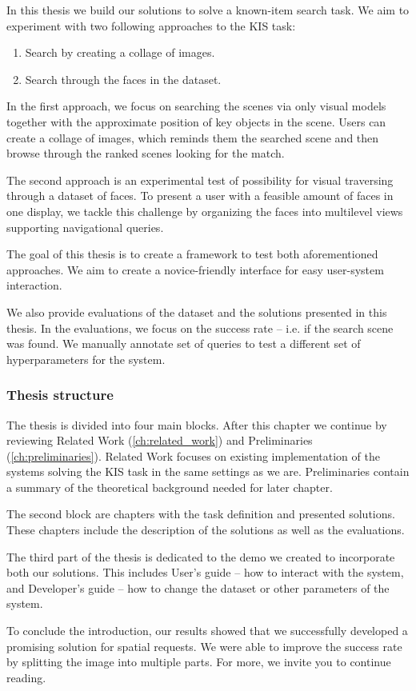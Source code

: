 In this thesis we build our solutions to solve a known-item search task. We aim to experiment with two following approaches to the KIS task:

\begin{enumerate}
  \item Search by creating a collage of images.
  \item Search through the faces in the dataset.
\end{enumerate}

In the first approach, we focus on searching the scenes via only visual models together with the approximate position of key objects in the scene. Users can create a collage of images, which reminds them the searched scene and then browse through the ranked scenes looking for the match.

The second approach is an experimental test of possibility for visual traversing through a  dataset of faces. To present a user with a feasible amount of faces in one display, we tackle this challenge by organizing the faces into multilevel views supporting navigational queries.

The goal of this thesis is to create a framework to test both aforementioned approaches. We aim to create a novice-friendly interface for easy user-system interaction.

We also provide evaluations of the dataset and the solutions presented in this thesis. In the evaluations, we focus on the success rate -- i.e. if the search scene was found. We manually annotate set of queries to test a different set of hyperparameters for the system.

\subsubsection*{Thesis structure}

The thesis is divided into four main blocks. After this chapter we continue by reviewing Related Work (\autoref{ch:related_work}) and Preliminaries (\autoref{ch:preliminaries}). Related Work focuses on existing implementation of the systems solving the KIS task in the same settings as we are. Preliminaries contain a summary of the theoretical background needed for later chapter.

The second block are chapters with the task definition and presented solutions. These chapters include the description of the solutions as well as the evaluations.

The third part of the thesis is dedicated to the demo we created to incorporate both our solutions. This includes User's guide -- how to interact with the system, and Developer's guide -- how to change the dataset or other parameters of the system.

\bigskip
To conclude the introduction, our results showed that we successfully developed a promising solution for spatial requests. We were able to improve the success rate by splitting the image into multiple parts. For more, we invite you to continue reading.
